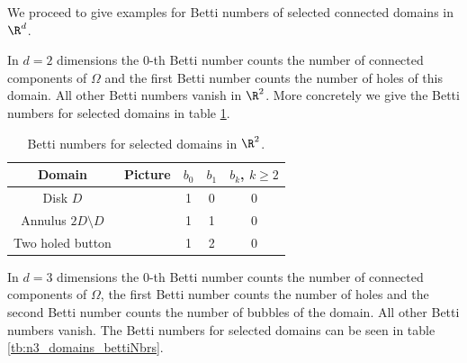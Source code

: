 We proceed to give examples for Betti numbers of selected connected domains in $\R^d$.
\begin{example}[In flatland]
  In $d=2$ dimensions the $0$-th Betti number counts the number of connected components
  of $\Omega$ and the first Betti number counts the number of holes of this domain.
  All other Betti numbers vanish in $\R^2$.
  More concretely we give the Betti numbers for selected domains in table \ref{tb:n2_domains_bettiNbrs}.
\end{example}

\begin{table}
  \centering
  \renewcommand{\arraystretch}{3}
  \begin{tabular}{c|c|c|c|c}
    Domain & Picture & $b_0$ & $b_1$ & $b_k$, $k\geq2$ \\ \hline
    Disk $D$ & 
    \begin{minipage}{0.1\textwidth}
      \def\svgwidth{\textwidth}
      
    \end{minipage}
    & 1 & 0 & 0 \\
    Annulus $2D\setminus D$ & 
    \begin{minipage}{0.1\textwidth}
      \def\svgwidth{\textwidth}
      
    \end{minipage}
    & 1 & 1 & 0 \\
    Two holed button & 
    \begin{minipage}{0.1\textwidth}
      \def\svgwidth{\textwidth}
      
    \end{minipage}
    & 1 & 2 & 0 \\
  \end{tabular}
  \caption{Betti numbers for selected domains in $\R^2$.}
  \label{tb:n2_domains_bettiNbrs}
\end{table}

\begin{example}[In spaceland]
  In $d=3$ dimensions the $0$-th Betti number counts the number of connected components
  of $\Omega$, the first Betti number counts the number of holes and the second Betti number
  counts the number of bubbles of the domain. All other Betti numbers vanish.
  The Betti numbers for selected domains can be seen in table \ref{tb:n3_domains_bettiNbrs}.
\end{example}

